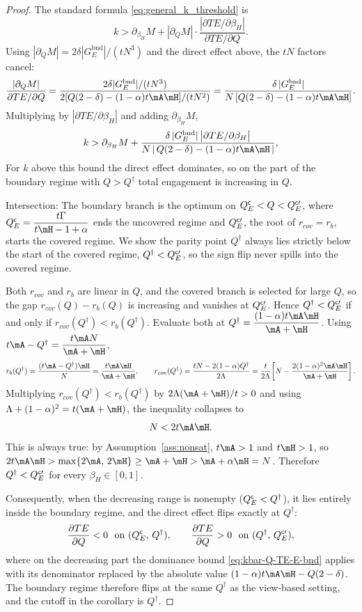\begin{proof}
The standard formula \eqref{eq:general_k_threshold} is
\[
k > \partial_{\beta_H}M + |\partial_Q M|\cdot
\frac{|\partial TE/\partial\beta_H|}{\partial TE/\partial Q}.
\]
Using $|\partial_Q M| = 2\delta|G_E^{\mathrm{bnd}}|/(tN^3)$ and the direct effect above,
the $tN$ factors cancel:
\[
\frac{|\partial_Q M|}{\partial TE/\partial Q}
= \frac{2\delta|G_E^{\mathrm{bnd}}|/(tN^3)}
{2[Q(2-\delta) - (1-\alpha)t\mA\mH]/(tN^2)}
= \frac{\delta\,|G_E^{\mathrm{bnd}}|}{N\,[Q(2-\delta) - (1-\alpha)t\mA\mH]}.
\]
Multiplying by $|\partial TE/\partial\beta_H|$ and adding $\partial_{\beta_H}M$,
\begin{equation}\label{eq:kbar-Q-TE-E-bnd}
k > \partial_{\beta_H}M
+ \frac{\delta\,|G_E^{\mathrm{bnd}}|\,\bigl|\partial TE/\partial\beta_H\bigr|}
{N\,|\,Q(2-\delta) - (1-\alpha)t\mA\mH\,|},
\end{equation}
For $k$ above this bound the
direct effect dominates, so on the part of the boundary regime with $Q>Q^{\dagger}$
total engagement is increasing in $Q$.

Intersection: The boundary branch is the optimum on
$Q^{\sf c}_E<Q<Q^{\sf c\prime}_E$, where $Q^{\sf c}_E=\dfrac{t\Gamma}{t\mH-1+\alpha}$ ends the
uncovered regime and $Q^{\sf c\prime}_E$, the root of $r_{cov}=r_b$, starts the covered
regime. We show the parity point $Q^{\dagger}$ always lies strictly below the start of the
covered regime, $Q^{\dagger}<Q^{\sf c\prime}_E$, so the sign flip never spills into the
covered regime.

Both $r_{cov}$ and $r_b$ are linear in $Q$, and the covered branch is selected
for large $Q$, so the gap $r_{cov}(Q)-r_b(Q)$ is increasing and vanishes at
$Q^{\sf c\prime}_E$. Hence $Q^{\dagger}<Q^{\sf c\prime}_E$ if and only if
$r_{cov}(Q^{\dagger})<r_b(Q^{\dagger})$. Evaluate both at
$Q^{\dagger}=\dfrac{(1-\alpha)t\mA\mH}{\mA+\mH}$. Using
$t\mA-Q^{\dagger}=\dfrac{t\mA N}{\mA+\mH}$,
\[
r_b(Q^{\dagger})=\frac{(t\mA-Q^{\dagger})\mH}{N}=\frac{t\mA\mH}{\mA+\mH},
\qquad
r_{cov}(Q^{\dagger})=\frac{tN-2(1-\alpha)Q^{\dagger}}{2\Lambda}
=\frac{t}{2\Lambda}\!\left[N-\frac{2(1-\alpha)^2\mA\mH}{\mA+\mH}\right].
\]
Multiplying $r_{cov}(Q^{\dagger})<r_b(Q^{\dagger})$ by $2\Lambda(\mA+\mH)/t>0$ and using
$\Lambda+(1-\alpha)^2=t(\mA+\mH)$, the inequality collapses to
\[
N<2t\mA\mH.
\]
This is always true: by Assumption~\ref{ass:nonsat}, $t\mA>1$ and $t\mH>1$, so
$2t\mA\mH>\max\{2\mA,\,2\mH\}\ge \mA+\mH>\mA+\alpha\mH=N$. Therefore
$Q^{\dagger}<Q^{\sf c\prime}_E$ for every $\beta_H\in[0,1]$.

Consequently, when the decreasing range is nonempty
($Q^{\sf c}_E<Q^{\dagger}$), it lies entirely inside the boundary regime, and the direct
effect flips exactly at $Q^{\dagger}$:
\[
\frac{\partial TE}{\partial Q}<0 \ \text{ on } (Q^{\sf c}_E,\,Q^{\dagger}),
\qquad
\frac{\partial TE}{\partial Q}>0 \ \text{ on } (Q^{\dagger},\,Q^{\sf c\prime}_E),
\]
where on the decreasing part the dominance bound \eqref{eq:kbar-Q-TE-E-bnd} applies with
its denominator replaced by the absolute value $(1-\alpha)t\mA\mH-Q(2-\delta)$. The
boundary regime therefore flips at the same $Q^{\dagger}$ as the view-based setting, and
the cutoff in the corollary is $Q^{\dagger}$.



\end{proof}
